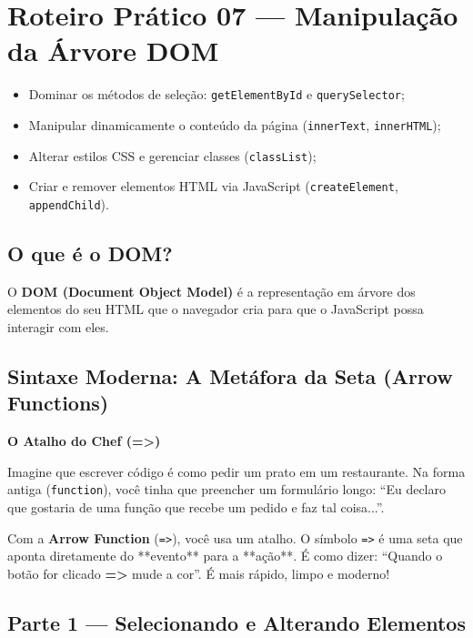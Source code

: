 \documentclass[12pt,a4paper]{article}
\begin{document}
\section{Roteiro Prático 07 — Manipulação da Árvore DOM}

\begin{boxObjetivos}
\begin{itemize}
    \item Dominar os métodos de seleção: \texttt{getElementById} e \texttt{querySelector};
    \item Manipular dinamicamente o conteúdo da página (\texttt{innerText}, \texttt{innerHTML});
    \item Alterar estilos CSS e gerenciar classes (\texttt{classList});
    \item Criar e remover elementos HTML via JavaScript (\texttt{createElement}, \texttt{appendChild}).
\end{itemize}
\end{boxObjetivos}

\subsection{O que é o DOM?}
O \textbf{DOM (Document Object Model)} é a representação em árvore dos elementos do seu HTML que o navegador cria para que o JavaScript possa interagir com eles.

\subsection{Sintaxe Moderna: A Metáfora da Seta (Arrow Functions)}

\begin{boxDica}
\textbf{O Atalho do Chef (=>)}

Imagine que escrever código é como pedir um prato em um restaurante. Na forma antiga (\texttt{function}), você tinha que preencher um formulário longo: ``Eu declaro que gostaria de uma função que recebe um pedido e faz tal coisa...''.

Com a \textbf{Arrow Function} (\texttt{=>}), você usa um atalho. O símbolo \texttt{=>} é uma seta que aponta diretamente do **evento** para a **ação**. É como dizer: ``Quando o botão for clicado \textbf{=>} mude a cor''. É mais rápido, limpo e moderno!
\end{boxDica}

\subsection{Parte 1 — Selecionando e Alterando Elementos}
\end{document}
